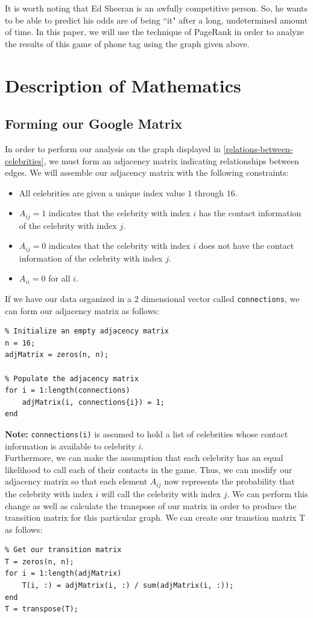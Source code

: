 \documentclass[11pt]{article}
\begin{document}
      It is worth noting that Ed Sheeran is an awfully competitive person.  
      So, he wants to be able to predict his odds are of being ``it" after a long, undetermined amount of time.
      In this paper, we will use the technique of PageRank in order to analyze the results of this game of phone tag using the graph given above.

    \section{Description of Mathematics}
      \subsection{Forming our Google Matrix}
      In order to perform our analysis on the graph displayed in \ref{relations-between-celebrities}, we must form an adjacency matrix indicating relationships between edges.
      We will assemble our adjacency matrix with the following constraints$:$
      \begin{itemize}
        \item All celebrities are given a unique index value $1$ through $16$.
        \item $A_{ij} = 1$ indicates that the celebrity with index $i$ has the contact information of the celebrity with index $j$.
        \item $A_{ij} = 0$ indicates that the celebrity with index $i$ does not have the contact information of the celebrity with index $j$.
        \item $A_{ii} = 0$ for all $i$.
      \end{itemize}

      If we have our data organized in a 2 dimensional vector called \texttt{connections}, we can form our adjacency matrix as follows:
      \begin{lstlisting}
% Initialize an empty adjacency matrix
n = 16;
adjMatrix = zeros(n, n);

% Populate the adjacency matrix
for i = 1:length(connections)
    adjMatrix(i, connections{i}) = 1;
end
      \end{lstlisting}
      
      \textbf{Note:} \texttt{connections(i)} is assumed to hold a list of celebrities whose contact information is available to celebrity $i$.
      \\
      
      \label{create-transition-matrix}
      Furthermore, we can make the assumption that each celebrity has an equal likelihood to call each of their contacts in the game.
      Thus, we can modify our adjacency matrix so that each element $A_{ij}$ now represents the probability that the celebrity with index $i$ will call the celebrity with index $j$.
      We can perform this change as well as calculate the transpose of our matrix in order to produce the transition matrix for this particular graph.
      We can create our transtion matrix T as follows:
\begin{lstlisting}
% Get our transition matrix
T = zeros(n, n);
for i = 1:length(adjMatrix)
    T(i, :) = adjMatrix(i, :) / sum(adjMatrix(i, :));
end
T = transpose(T);
\end{lstlisting}
      
\end{document}
